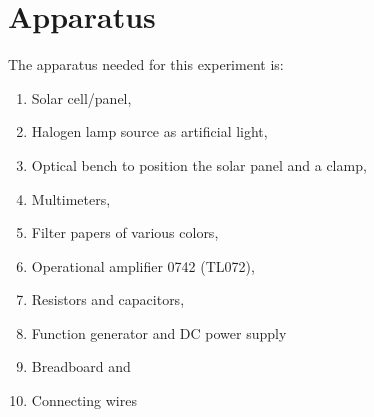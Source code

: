 \documentclass[%
 aip,
 amsmath,amssymb,
 reprint, floatfix%
]{revtex4-2}
\begin{document}
    
\section{Apparatus}
    The apparatus needed for this experiment is:
    \begin{enumerate}
        \item Solar cell/panel,
        \item Halogen lamp source as artificial light,
        \item Optical bench to position the solar panel and a clamp,
        \item Multimeters,
        \item Filter papers of various colors,
        \item Operational amplifier 0742 (TL072),
        \item Resistors and capacitors,
        \item Function generator and DC power supply
        \item Breadboard and
        \item Connecting wires
    \end{enumerate}
\end{document}
